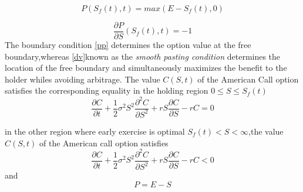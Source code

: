 \documentclass[12pt]{article}
\numberwithin{equation}{section} %
\begin{document}
 \begin{equation}\label{pp}
P(S_{f}(t),t)=max(E-S_{f}(t),0)
 \end{equation}

\begin{equation}\label{dv}
 \frac{\partial P}{\partial S}(S_{f}(t),t)=-1
 \end{equation}
  The boundary condition \ref{pp} determines the option value at the
  free boundary,whereas \ref{dv}known as the \textit{smooth pasting condition} determines the location of the
  free boundary and simultaneously maximizes the benefit to the
  holder whiles avoiding arbitrage.
  The value $C(S,t)$ of the American Call  option satisfies the
  corresponding equality in the holding region
 $0\leq S\leq S_{f}(t)$
 \begin{equation}
\frac{\partial C}{\partial t}+\frac{1}{2}\sigma^2S^2\frac{\partial^2
C}{\partial S^2} +rS\frac{\partial C}{\partial S}-rC=0
 \end{equation}

in the other region where early exercise is optimal $S_{f}(t)<
S<\infty$,the value $C(S,t)$ of the American call option satisfies
 \begin{equation}
\frac{\partial C}{\partial t}+\frac{1}{2}\sigma^2S^2\frac{\partial^2
C}{\partial S^2} +rS\frac{\partial C}{\partial S}-rC<0
 \end{equation}
 and
 \begin{equation}
P=E-S
 \end{equation}
\end{document}
